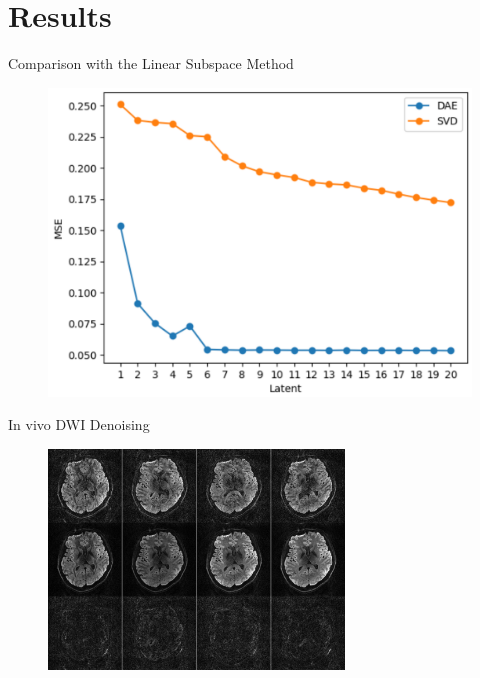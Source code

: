 \documentclass[hyperref={colorlinks=true,linkcolor=blue}, aspectratio=169]{beamer}
\begin{document}
	\section{Results}

	\begin{frame}{Comparison with the Linear Subspace Method}
		\begin{figure}
			\includegraphics[height=0.8\textheight]{figures/SVD_DAE.png}
		\end{figure}
	\end{frame}

	\begin{frame}{In vivo DWI Denoising}
		\begin{figure}
			\includegraphics[width=0.7\textwidth]{figures/MUSE_train_DAE_Latent10_Depth04_epoch0100_dwi.png}
		\end{figure}
	\end{frame}
\end{document}
